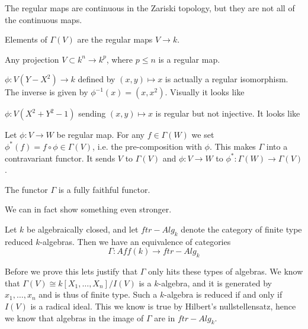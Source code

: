 \begin{remark}
The regular maps are continuous in the Zariski topology, but they are not all of the continuous maps. 
\end{remark}

\begin{example}
Elements of $\Gamma(V)$ are the regular maps $V\longrightarrow k$.
\end{example}

\begin{example}
Any projection $V\subset k^n\longrightarrow k^p$, where $p\leq n$ is a regular map. 
\end{example}

\begin{example}
$\phi: V(Y-X^2)\longrightarrow k$ defined by $(x, y)\mapsto x$ is actually a regular isomorphism. The inverse is given by $\phi^{-1}(x)=(x, x^2)$. Visually it looks like

\begin{center}
\def\svgwidth{0.4\textwidth}

\end{center}
\end{example}


\begin{example}
$\phi:V(X^2+Y^2-1)$ sending $(x, y)\mapsto x$ is regular but not injective. It looks like

\begin{center}
\def\svgwidth{0.4\textwidth}

\end{center}
\end{example}


Let $\phi:V\longrightarrow W$ be regular map. For any $f\in \Gamma(W)$ we set $\phi^*(f)=f\circ\phi \in \Gamma(V)$, i.e. the pre-composition with $\phi$. This makes $\Gamma$ into a contravariant functor. It sends $V$ to $\Gamma(V)$ and $\phi:V\longrightarrow W$ to $\phi^*:\Gamma(W)\longrightarrow \Gamma(V)$. 

\begin{proposition}
The functor $\Gamma$ is a fully faithful functor. 
\end{proposition}

We can in fact show something even stronger. 

\begin{theorem}
Let $k$ be algebraically closed, and let $ftr-Alg_k$ denote the category of finite type reduced $k$-algebras. Then we have an equivalence of categories
\begin{equation*}
    \Gamma: Aff(k)\longrightarrow ftr-Alg_k
\end{equation*}
\end{theorem}
Before we prove this lets justify that $\Gamma$ only hits these types of algebras. We know that $\Gamma(V)\cong k[X_1, \ldots, X_n]/I(V)$ is a $k$-algebra, and it is generated by $x_1, \ldots, x_n$ and is thus of finite type. Such a $k$-algebra is reduced if and only if $I(V)$ is a radical ideal. This we know is true by Hilbert's nullstellensatz, hence we know that algebras in the image of $\Gamma$ are in $ftr-Alg_k$. 

